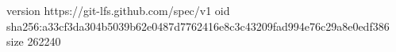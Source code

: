 version https://git-lfs.github.com/spec/v1
oid sha256:a33cf3da304b5039b62e0487d7762416e8c3c43209fad994e76c29a8e0edf386
size 262240
